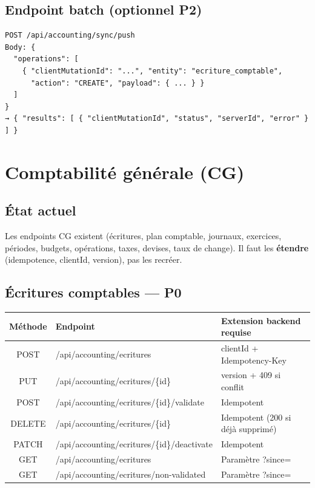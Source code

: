\documentclass[12pt,a4paper]{report}
\begin{document}
\section{Endpoint batch (optionnel P2)}

\begin{verbatim}
POST /api/accounting/sync/push
Body: {
  "operations": [
    { "clientMutationId": "...", "entity": "ecriture_comptable",
      "action": "CREATE", "payload": { ... } }
  ]
}
→ { "results": [ { "clientMutationId", "status", "serverId", "error" } ] }
\end{verbatim}

\chapter{Comptabilité générale (CG)}

\section{État actuel}

Les endpoints CG existent (écritures, plan comptable, journaux, exercices, périodes, budgets, opérations, taxes, devises, taux de change). Il faut les \textbf{étendre} (idempotence, clientId, version), pas les recréer.

\section{Écritures comptables --- P0}

\begin{longtable}{@{}cp{5.5cm}p{5cm}@{}}
\hline
\textbf{Méthode} & \textbf{Endpoint} & \textbf{Extension backend requise} \\
\hline
\endhead
POST & /api/accounting/ecritures & clientId + Idempotency-Key \\
\hline
PUT & /api/accounting/ecritures/\{id\} & version + 409 si conflit \\
\hline
POST & /api/accounting/ecritures/\{id\}/validate & Idempotent \\
\hline
DELETE & /api/accounting/ecritures/\{id\} & Idempotent (200 si déjà supprimé) \\
\hline
PATCH & /api/accounting/ecritures/\{id\}/deactivate & Idempotent \\
\hline
GET & /api/accounting/ecritures & Paramètre ?since= \\
\hline
GET & /api/accounting/ecritures/non-validated & Paramètre ?since= \\
\hline
\end{longtable}
\end{document}

